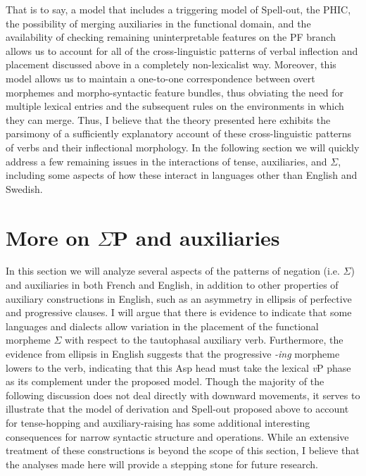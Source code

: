 \onehalfspacing
That is to say, a model that includes a triggering model of Spell-out, the PHIC, the possibility of merging auxiliaries in the functional domain, and the availability of checking remaining uninterpretable features on the PF branch allows us to account for all of the cross-linguistic patterns of verbal inflection and placement discussed above in a completely non-lexicalist way. Moreover, this model allows us to maintain a one-to-one correspondence between overt morphemes and morpho-syntactic feature bundles, thus obviating the need for multiple lexical entries and the subsequent rules on the environments in which they can merge. Thus, I believe that the theory presented here exhibits the parsimony of a sufficiently explanatory account of these cross-linguistic patterns of verbs and their inflectional morphology. In the following section we will quickly address a few remaining issues in the interactions of tense, auxiliaries, and $\Sigma$, including some aspects of how these interact in languages other than English and Swedish.

\section{More on $\Sigma$P and auxiliaries}\label{sigma_aux_sec}
In this section we will analyze several aspects of the patterns of negation (i.e. $\Sigma$) and auxiliaries in both French and English, in addition to other properties of auxiliary constructions in English, such as an asymmetry in ellipsis of perfective and progressive clauses. I will argue that there is evidence to indicate that some languages and dialects allow variation in the placement of the functional morpheme $\Sigma$ with respect to the tautophasal auxiliary verb. Furthermore, the evidence from ellipsis in English suggests that the progressive {\it -ing} morpheme lowers to the verb, indicating that this Asp head must take the lexical {\it v}P phase as its complement under the proposed model. Though the majority of the following discussion does not deal directly with downward movements, it serves to illustrate that the model of derivation and Spell-out proposed above to account for tense-hopping and auxiliary-raising has some additional interesting consequences for narrow syntactic structure and operations.  While an extensive treatment of these constructions is beyond the scope of this section, I believe that the analyses made here will provide a stepping stone for future research.

